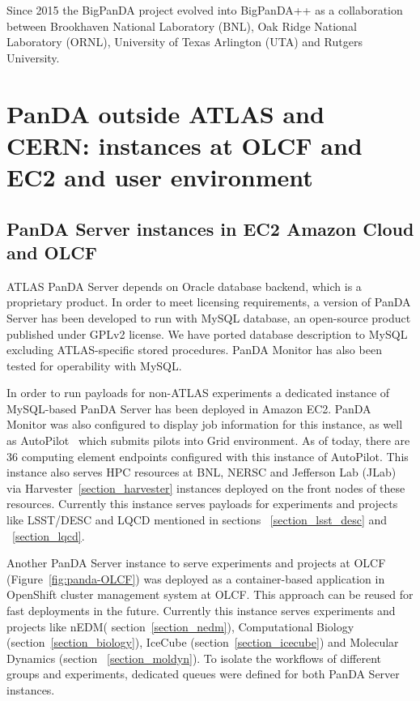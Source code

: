 \documentclass{webofc}
\begin{document}
Since 2015 the BigPanDA project evolved into  BigPanDA++ as a collaboration between Brookhaven National Laboratory (BNL), Oak Ridge National Laboratory (ORNL),  University of Texas Arlington (UTA) and Rutgers University.


\section{PanDA outside ATLAS and CERN: instances at OLCF and EC2 and user environment}

\subsection{PanDA Server instances in EC2 Amazon Cloud and OLCF}


ATLAS PanDA Server depends on Oracle database backend, which is a proprietary product. In order to meet licensing requirements, a version of PanDA Server has been developed to run with MySQL database, an open-source product published under GPLv2 license.  
We have ported database description to MySQL excluding ATLAS-specific stored procedures. PanDA Monitor has also been tested for operability with MySQL.

In order to run payloads for non-ATLAS experiments a dedicated instance of MySQL-based PanDA Server has been deployed in Amazon EC2.  
PanDA Monitor was also configured to display job information for this instance, as well as AutoPilot~\cite{PanDAPilotSubmission} which submits pilots into Grid environment. 
As of today, there are 36 computing element endpoints configured with this instance of AutoPilot. 
This instance also serves HPC resources at BNL, NERSC and Jefferson Lab (JLab) via Harvester~\ref{section_harvester} instances deployed on the front nodes of these resources. 
Currently this instance serves payloads for experiments and projects like LSST/DESC and LQCD mentioned in sections ~\ref{section_lsst_desc} and ~\ref{section_lqcd}.

Another  PanDA Server instance to serve experiments and projects at OLCF (Figure~\ref{fig:panda-OLCF}) was deployed as a container-based application in OpenShift cluster management system at OLCF. This approach can be reused for fast deployments in the future. Currently this instance serves experiments and projects like nEDM( section~\ref{section_nedm}), Computational Biology (section~\ref{section_biology}), IceCube (section~\ref{section_icecube}) and Molecular Dynamics (section ~\ref{section_moldyn}).
To isolate the workflows of different groups and experiments, dedicated queues were defined for both PanDA Server instances. 
\end{document}
